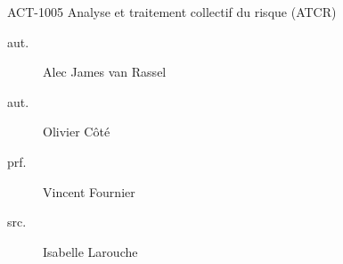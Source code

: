 \begin{contrib}{ACT-1005\: Analyse et traitement collectif du risque (ATCR)}
\begin{description}
	\item[aut.]	Alec James van Rassel
	\item[aut.]	Olivier Côté
	\item[prf.]	Vincent Fournier
	\item[src.]	Isabelle Larouche
\end{description}
\end{contrib}